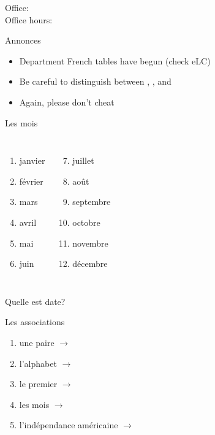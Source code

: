 \documentclass{beamer}
\subtitle[Dates]{Les dates importantes}
\begin{document}
  \begin{frame}
    \titlepage
    \tiny{Office: \\
          Office hours: }
  \end{frame}

  \begin{frame}{Annonces}
    \begin{itemize}
      \item Department French tables have begun (check eLC)
      \item Be careful to distinguish between , , and 
      \item Again, please don't cheat
    \end{itemize}
  \end{frame}

  \begin{frame}{Les mois}
    \begin{columns}
        \begin{enumerate}
          \item janvier
          \item février
          \item mars
          \item avril
          \item mai
          \item juin
        \end{enumerate}
        \begin{enumerate}
          \setcounter{enumi}{6}
          \item juillet
          \item août
          \item septembre
          \item octobre
          \item novembre
          \item décembre
        \end{enumerate}
    \end{columns}
    \vspace{1cm}
    Quelle est date? \underline{}
  \end{frame}

  \begin{frame}{Les associations}
    \begin{enumerate}
      \item une paire $\to$ \underline{}
      \item l'alphabet $\to$ \underline{}
      \item le premier $\to$ \underline{}
      \item les mois $\to$ \underline{}
      \item l'indépendance américaine $\to$ \underline{}
    \end{enumerate}
  \end{frame}
\end{document}
